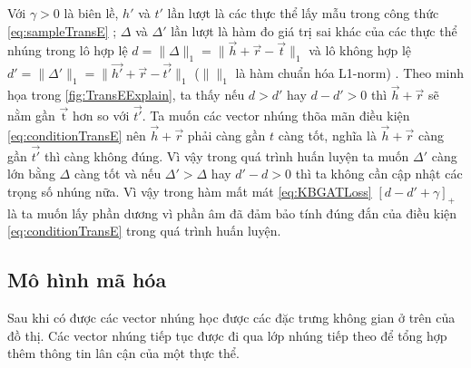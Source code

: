 Với $\gamma > 0$ là biên lề, $h'$ và $t'$ lần lượt là các thực thể lấy mẫu trong công thức \ref{eq:sampleTransE} ; $\Delta$ và $\Delta'$ lần lượt là hàm đo giá trị sai khác của các thực thể nhúng trong lô hợp lệ $d = \big\|\Delta \big\|_{1}  = \big\| \overrightarrow{h} + \overrightarrow{r} - \overrightarrow{t}\big\|_{1}$ và lô không hợp lệ $d' = \big\|\Delta' \big\|_{1} = \big\| \overrightarrow{h'} + \overrightarrow{r} - \overrightarrow{t'}\big\|_{1}$ ($\|\|_{1}$ là hàm chuẩn hóa L1-norm) .
Theo minh họa trong \autoref{fig:TransEExplain}, ta thấy nếu $d > d'$ hay $d - d' > 0$ thì $\overrightarrow{h} + \overrightarrow{r}$ sẽ nằm gần $\overrightarrow{\text{t}}$ hơn so với $\overrightarrow{t'}$. Ta muốn các vector nhúng thõa mãn điều kiện \ref{eq:conditionTransE} nên $\overrightarrow{h} + \overrightarrow{r}$ phải càng gần $t$ càng tốt, nghĩa là $\overrightarrow{h} + \overrightarrow{r}$ càng gần $\overrightarrow{t'}$ thì càng không đúng. Vì vậy trong quá trình huấn luyện ta muốn $\Delta'$ càng lớn bằng $\Delta$ càng tốt và nếu $\Delta' > \Delta$ hay $d' - d > 0$ thì ta không cần cập nhật các trọng số nhúng nữa. Vì vậy trong hàm mất mát \ref{eq:KBGATLoss} $[d - d' + \gamma]_{+}$ là ta muốn lấy phần dương vì phần âm đã đảm bảo tính đúng đắn của điều kiện \ref{eq:conditionTransE} trong quá trình huấn luyện.

\subsection{Mô hình mã hóa}
\label{sec:encodeKBGAT}

Sau khi có được các vector nhúng học được các đặc trưng không gian ở trên của đồ thị. Các vector nhúng tiếp tục được đi qua lớp nhúng tiếp theo để tổng hợp thêm thông tin lân cận của một thực thể.


